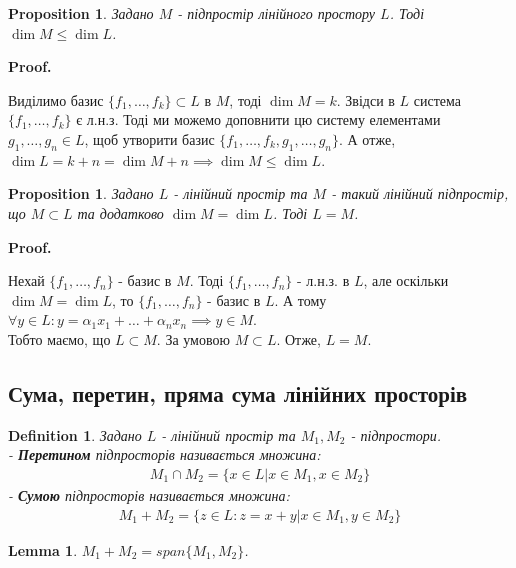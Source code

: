 \documentclass[a4paper, 10pt]{article}
\makeatletter
\theoremstyle{theoremdd}
\newtheorem{definition}[theorem]{Definition}
\newtheorem{proposition}[theorem]{Proposition}
\newtheorem{lemma}[theorem]{Lemma}
\renewenvironment{proof}[1][Proof.\\]{\par
\pushQED{\hfill \qed}%
\normalfont \topsep6\p@\@plus6\p@\relax
\trivlist
\item\relax
{\bfseries
#1\@addpunct{.}}\hspace\labelsep\ignorespaces
}{%
\popQED\endtrivlist\@endpefalse
}
\makeatother
\begin{document}
	\begin{proposition}
	Задано $M$ - підпростір лінійного простору $L$. Тоді $\dim M \leq \dim L$.
	\end{proposition}
	
	\begin{proof}
	Виділимо базис $\{f_1,\dots,f_k\} \subset L$ в $M$, тоді $\dim M = k$. Звідси в $L$ система $\{f_1,\dots,f_k\}$ є л.н.з. Тоді ми можемо доповнити цю систему елементами $g_1,\dots,g_n \in L$, щоб утворити базис $\{f_1,\dots,f_k,g_1,\dots,g_n\}$. А отже, $\dim L = k+n = \dim M + n \implies \dim M \leq \dim L$.
	\end{proof}
	
	\begin{proposition}
	\label{about_same_dim_prp}
	Задано $L$ - лінійний простір та $M$ - такий лінійний підпростір, що $M \subset L$ та додатково $\dim M = \dim L$. Тоді $L=M$.
	\end{proposition}
	
	\begin{proof}
	Нехай $\{f_1,\dots,f_n\}$ - базис в $M$. Тоді $\{f_1,\dots,f_n\}$ - л.н.з. в $L$, але оскільки $\dim M = \dim L$, то $\{f_1,\dots,f_n\}$ - базис в $L$. А тому $\forall y \in L: y = \alpha_1 x_1 + \dots + \alpha_n x_n \implies y \in M$.\\
	Тобто маємо, що $L \subset M$. За умовою $M \subset L$. Отже, $L=M$.
	\end{proof}
	
	\subsection{Сума, перетин, пряма сума лінійних просторів}
	\begin{definition}
	Задано $L$ - лінійний простір та $M_1, M_2$ - підпростори.\\
	- \textbf{Перетином} підпросторів називається множина:
	\begin{align*}
	M_1 \cap M_2 = \{x \in L | x \in M_1, x \in M_2 \}
	\end{align*}
	- \textbf{Сумою} підпросторів називається множина:
	\begin{align*}
	M_1 + M_2 = \{z \in L: z = x + y | x \in M_1, y \in M_2\}
	\end{align*}
	\end{definition}
	
	\begin{lemma}
	$M_1 + M_2 = span\{M_1, M_2\}$.
	\end{lemma}
	
\end{document}
